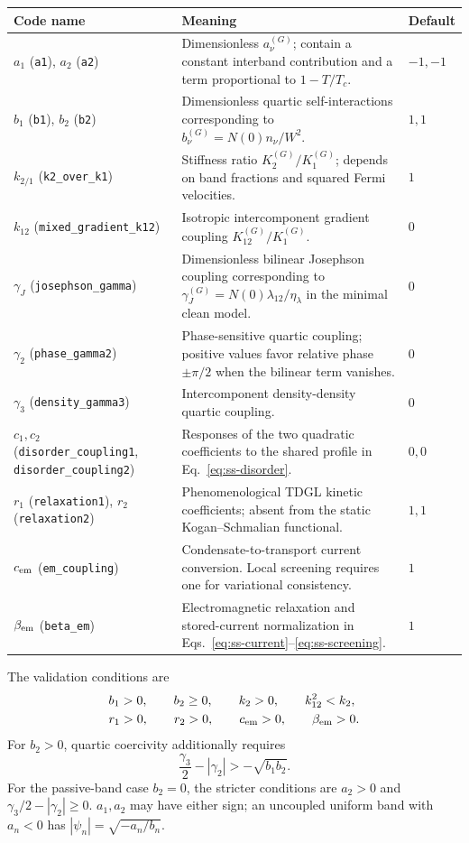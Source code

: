 \documentclass[11pt]{article}
\begin{document}
{\small
\begin{longtable}{@{}p{}p{}p{}@{}}
\toprule
Code name & Meaning & Default\\
\midrule
\endhead
$a_1$ (\texttt{a1}), $a_2$ (\texttt{a2}) & Dimensionless $a_\nu^{(G)}$; contain a constant interband contribution and a term proportional to $1-T/T_c$. & $-1,-1$\\
$b_1$ (\texttt{b1}), $b_2$ (\texttt{b2}) & Dimensionless quartic self-interactions corresponding to $b_\nu^{(G)}=N(0)n_\nu/W^2$. & $1,1$\\
$k_{2/1}$ (\texttt{k2\_over\_k1}) & Stiffness ratio $K_2^{(G)}/K_1^{(G)}$; depends on band fractions and squared Fermi velocities. & $1$\\
$k_{12}$ (\texttt{mixed\_gradient\_k12}) & Isotropic intercomponent gradient coupling $K_{12}^{(G)}/K_1^{(G)}$. & $0$\\
$\gamma_J$ (\texttt{josephson\_gamma}) & Dimensionless bilinear Josephson coupling corresponding to $\gamma_J^{(G)}=N(0)\lambda_{12}/\eta_\lambda$ in the minimal clean model. & $0$\\
$\gamma_2$ (\texttt{phase\_gamma2}) & Phase-sensitive quartic coupling; positive values favor relative phase $\pm\pi/2$ when the bilinear term vanishes. & $0$\\
$\gamma_3$ (\texttt{density\_gamma3}) & Intercomponent density-density quartic coupling. & $0$\\
$c_1,c_2$ (\texttt{disorder\_coupling1}, \texttt{disorder\_coupling2}) & Responses of the two quadratic coefficients to the shared profile in Eq.~\eqref{eq:ss-disorder}. & $0,0$\\
$r_1$ (\texttt{relaxation1}), $r_2$ (\texttt{relaxation2}) & Phenomenological TDGL kinetic coefficients; absent from the static Kogan--Schmalian functional. & $1,1$\\
$c_{\rm em}$ (\texttt{em\_coupling}) & Condensate-to-transport current conversion. Local screening requires one for variational consistency. & $1$\\
$\beta_{\rm em}$ (\texttt{beta\_em}) & Electromagnetic relaxation and stored-current normalization in Eqs.~\eqref{eq:ss-current}--\eqref{eq:ss-screening}. & $1$\\
\bottomrule
\end{longtable}
}

\enlargethispage{3\baselineskip}
The validation conditions are
\begin{align}
    &b_1>0,\qquad b_2\geq0,\qquad k_2>0,\qquad k_{12}^2<k_2,\\
    &r_1>0,\qquad r_2>0,\qquad c_{\rm em}>0,\qquad
      \beta_{\rm em}>0.
\end{align}
For $b_2>0$, quartic coercivity additionally requires
\begin{equation}
  \frac{\gamma_3}{2}-|\gamma_2|>-\sqrt{b_1b_2}.
\end{equation}
For the passive-band case $b_2=0$, the stricter conditions are $a_2>0$ and
$\gamma_3/2-|\gamma_2|\geq0$.
$a_1,a_2$ may have either sign; an uncoupled uniform band with $a_n<0$ has
$|\psi_n|=\sqrt{-a_n/b_n}$.
\end{document}
